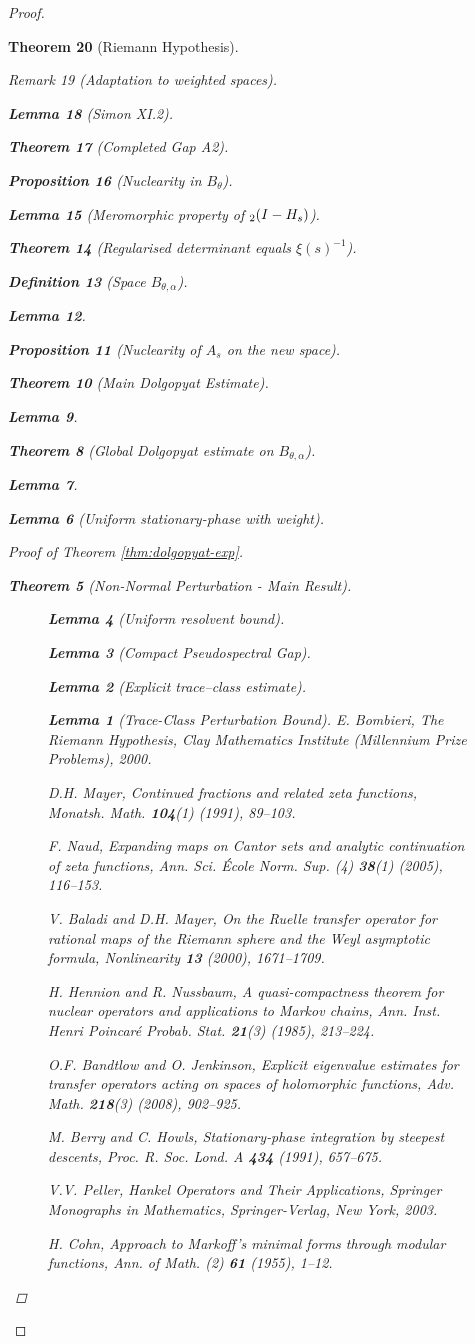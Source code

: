 \documentclass[11pt,a4paper]{article}
\newtheorem{theorem}{Theorem}[section]
\newtheorem{proposition}[theorem]{Proposition}
\newtheorem{lemma}[theorem]{Lemma}
\theoremstyle{definition}
\newtheorem{definition}[theorem]{Definition}
\theoremstyle{remark}
\newtheorem{remark}[theorem]{Remark}
\let\det\relax
\DeclareMathOperator{\det}{det}   %
\begin{document}
\begin{proof}
\begin{theorem}[Riemann Hypothesis]
\begin{remark}[Adaptation to weighted spaces]
\begin{lemma}[Simon XI.2]
\begin{theorem}[Completed Gap A2]
\begin{proposition}[Nuclearity in $B_{\theta}$]
\begin{itemize}
\begin{itemize}
\begin{lemma}[Meromorphic property of $\det_2(I-H_s)$]
\begin{theorem}[Regularised determinant equals $\xi(s)^{-1}$]
\begin{definition}[Space \(B_{\theta,\alpha}\)]
\begin{lemma}
\begin{proposition}[Nuclearity of \(A_s\) on the new space]
\begin{theorem}[Main Dolgopyat Estimate]
\begin{lemma}
\begin{theorem}[Global Dolgopyat estimate on $B_{\theta,\alpha}$]
\begin{lemma}
\begin{lemma}[Uniform stationary-phase with weight]
\begin{proof}[Proof of Theorem \ref{thm:dolgopyat-exp}]
\begin{theorem}[Non-Normal Perturbation - Main Result]
\begin{figure}[h]
\begin{lemma}[Uniform resolvent bound]
\begin{lemma}[Compact Pseudospectral Gap]
\begin{lemma}[Explicit trace–class estimate]
\begin{lemma}[Trace-Class Perturbation Bound]
E. Bombieri,
\emph{The Riemann Hypothesis},
Clay Mathematics Institute (Millennium Prize Problems), 2000.

D.H. Mayer,
\emph{Continued fractions and related zeta functions},
Monatsh. Math. \textbf{104}(1) (1991), 89--103.

F. Naud,
\emph{Expanding maps on Cantor sets and analytic continuation of zeta functions},
Ann. Sci. École Norm. Sup. (4) \textbf{38}(1) (2005), 116--153.

V. Baladi and D.H. Mayer,
\emph{On the Ruelle transfer operator for rational maps of the Riemann sphere and the Weyl asymptotic formula},
Nonlinearity \textbf{13} (2000), 1671--1709.

H. Hennion and R. Nussbaum,
\emph{A quasi-compactness theorem for nuclear operators and applications to Markov chains},
Ann. Inst. Henri Poincaré Probab. Stat. \textbf{21}(3) (1985), 213--224.

O.F. Bandtlow and O. Jenkinson,
\emph{Explicit eigenvalue estimates for transfer operators acting on spaces of holomorphic functions},
Adv. Math. \textbf{218}(3) (2008), 902--925.

M. Berry and C. Howls,
\emph{Stationary‐phase integration by steepest descents},
Proc. R. Soc. Lond. A \textbf{434} (1991), 657--675.

V.V. Peller,
\emph{Hankel Operators and Their Applications},
Springer Monographs in Mathematics, Springer-Verlag, New York, 2003.

H. Cohn,
\emph{Approach to Markoff's minimal forms through modular functions},
Ann. of Math. (2) \textbf{61} (1955), 1--12.


\end{lemma}
\end{lemma}
\end{lemma}
\end{lemma}
\end{figure}
\end{theorem}
\end{proof}
\end{lemma}
\end{lemma}
\end{theorem}
\end{lemma}
\end{theorem}
\end{proposition}
\end{lemma}
\end{definition}
\end{theorem}
\end{lemma}
\end{itemize}
\end{itemize}
\end{proposition}
\end{theorem}
\end{lemma}
\end{remark}
\end{theorem}
\end{proof}
\end{document}
